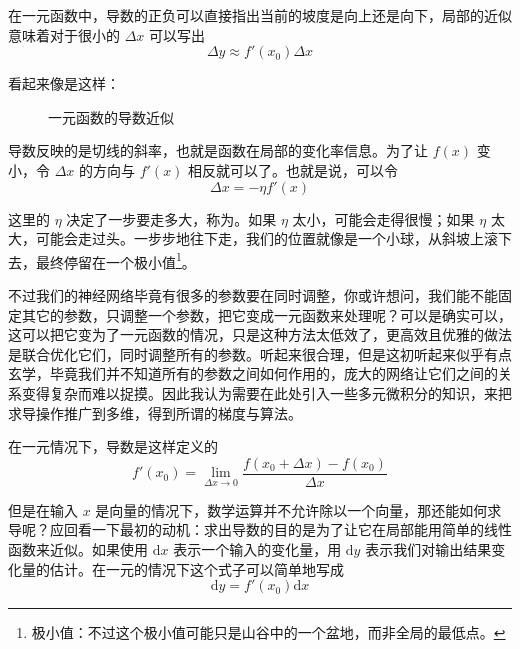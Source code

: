 在一元函数中，导数的正负可以直接指出当前的坡度是向上还是向下，局部的近似意味着对于很小的 $\Delta x$ 可以写出
\[
    \Delta y \approx f'(x_0)\Delta x
\]

看起来像是这样：
\begin{figure}[H]
\centering
{}
\caption{一元函数的导数近似}
\end{figure}

导数反映的是切线的斜率，也就是函数在局部的变化率信息。为了让 $f(x)$ 变小，令 $\Delta x$ 的方向与 $f'(x)$ 相反就可以了。也就是说，可以令
\[
    \Delta x = -\eta f'(x)
\]

这里的 $\eta$ 决定了一步要走多大，称为。如果 $\eta$ 太小，可能会走得很慢；如果 $\eta$ 太大，可能会走过头。一步步地往下走，我们的位置就像是一个小球，从斜坡上滚下去，最终停留在一个极小值\footnote{极小值：不过这个极小值可能只是山谷中的一个盆地，而非全局的最低点。}。

不过我们的神经网络毕竟有很多的参数要在同时调整，你或许想问，我们能不能固定其它的参数，只调整一个参数，把它变成一元函数来处理呢？可以是确实可以，这可以把它变为了一元函数的情况，只是这种方法太低效了，更高效且优雅的做法是联合优化它们，同时调整所有的参数。听起来很合理，但是这初听起来似乎有点玄学，毕竟我们并不知道所有的参数之间如何作用的，庞大的网络让它们之间的关系变得复杂而难以捉摸。因此我认为需要在此处引入一些多元微积分的知识，来把求导操作推广到多维，得到所谓的梯度与算法。

在一元情况下，导数是这样定义的
\[
    f'(x_0) = \lim_{\Delta x\to 0} \frac{f(x_0 + \Delta x) - f(x_0)}{\Delta x}
\]

但是在输入 $x$ 是向量的情况下，数学运算并不允许除以一个向量，那还能如何求导呢？应回看一下最初的动机：求出导数的目的是为了让它在局部能用简单的线性函数来近似。如果使用 $\mathrm{d}x$ 表示一个输入的变化量，用 $\mathrm{d}y$ 表示我们对输出结果变化量的估计。在一元的情况下这个式子可以简单地写成
\[
    \mathrm{d}y = f'(x_0) \mathrm{d}x
\]

